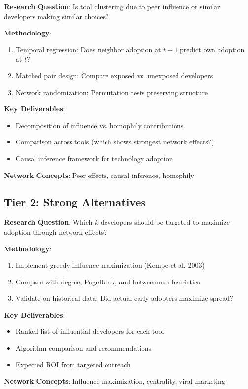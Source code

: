 \documentclass[11pt,letterpaper]{article}
\begin{document}
\begin{tcolorbox}[colback=green!5,colframe=green!50!black,title=Project 1B: Influence vs. Homophily in Tool Selection]
\textbf{Research Question}: Is tool clustering due to peer influence or similar developers making similar choices?

\textbf{Methodology}:
\begin{enumerate}
    \item Temporal regression: Does neighbor adoption at $t-1$ predict own adoption at $t$?
    \item Matched pair design: Compare exposed vs. unexposed developers
    \item Network randomization: Permutation tests preserving structure
\end{enumerate}

\textbf{Key Deliverables}:
\begin{itemize}
    \item Decomposition of influence vs. homophily contributions
    \item Comparison across tools (which shows strongest network effects?)
    \item Causal inference framework for technology adoption
\end{itemize}

\textbf{Network Concepts}: Peer effects, causal inference, homophily
\end{tcolorbox}

\subsection{Tier 2: Strong Alternatives}

\begin{tcolorbox}[colback=blue!5,colframe=blue!50!black,title=Project 2A: Influence Maximization for Developer Outreach]
\textbf{Research Question}: Which $k$ developers should be targeted to maximize adoption through network effects?

\textbf{Methodology}:
\begin{enumerate}
    \item Implement greedy influence maximization (Kempe et al. 2003)
    \item Compare with degree, PageRank, and betweenness heuristics
    \item Validate on historical data: Did actual early adopters maximize spread?
\end{enumerate}

\textbf{Key Deliverables}:
\begin{itemize}
    \item Ranked list of influential developers for each tool
    \item Algorithm comparison and recommendations
    \item Expected ROI from targeted outreach
\end{itemize}

\textbf{Network Concepts}: Influence maximization, centrality, viral marketing
\end{tcolorbox}
\end{document}
